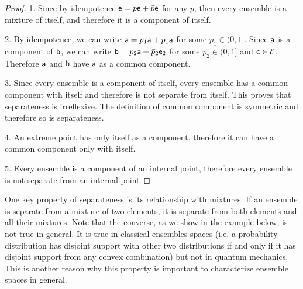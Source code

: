 \begin{mathSection}
\begin{proof}
	1. Since by idempotence $\ens = p \ens + \bar{p} \ens$ for any $p$, then every ensemble is a mixture of itself, and therefore it is a component of itself.
	
	2. By idempotence, we can write $\ens[a] = p_1 \ens[a] + \bar{p}_1 \ens[a]$ for some $p_1 \in (0,1]$. Since $\ens[a]$ is a component of $\ens[b]$, we can write $\ens[b] = p_2 \ens[a] + \bar{p}_2 \ens[e]_2$ for some $p_2 \in (0, 1]$ and $\ens[c] \in \Ens$. Therefore $\ens[a]$ and $\ens[b]$ have $\ens[a]$ as a common component.
	
	3. Since every ensemble is a component of itself, every ensemble has a common component with itself and therefore is not separate from itself. This proves that separateness is irreflexive. The definition of common component is symmetric and therefore so is separateness.
	
	4. An extreme point has only itself as a component, therefore it can have a common component only with itself.
	
	5. Every ensemble is a component of an internal point, therefore every ensemble is not separate from an internal point
\end{proof}
\end{mathSection}

One key property of separateness is its relationship with mixtures. If an ensemble is separate from a mixture of two elements, it is separate from both elements and all their mixtures. Note that the converse, as we show in the example below, is not true in general. It is true in classical ensembles spaces (i.e. a probability distribution has disjoint support with other two distributions if and only if it has disjoint support from any convex combination) but not in quantum mechanics. This is another reason why this property is important to characterize ensemble spaces in general.

